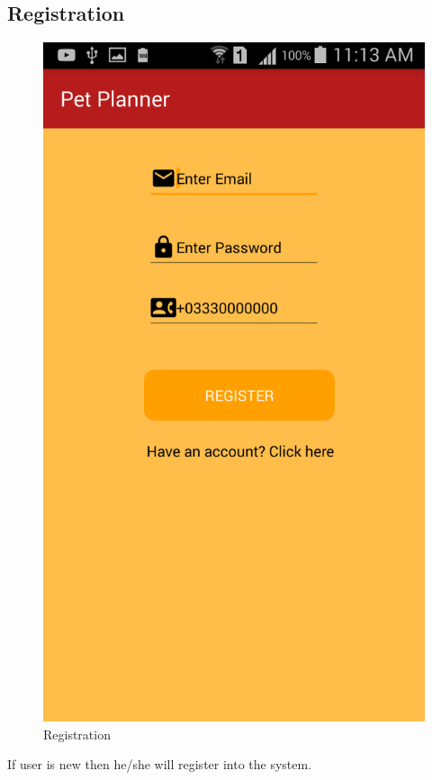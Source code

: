 \subsection{Registration}
\begin{figure}[H]
  \centering
    \includegraphics[scale=0.3]{82Registration}
     \caption{Registration}
\end{figure}

If user is new then he/she will register into the system.



